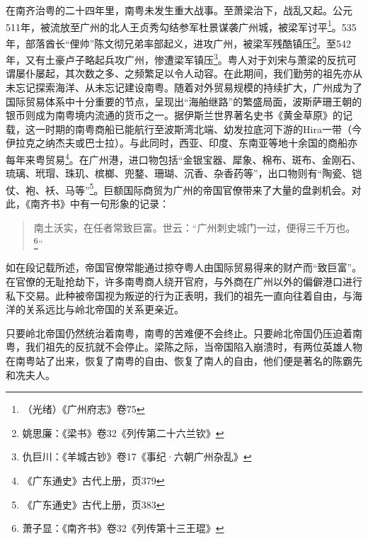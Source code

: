 在南齐治粤的二十四年里，南粤未发生重大战事。至萧梁治下，战乱又起。公元511年，被流放至广州的北人王贞秀勾结参军杜景谋袭广州城，被梁军讨平\footnote{（光绪）《广州府志》卷75}。535年，部落酋长“俚帅”陈文彻兄弟率部起义，进攻广州，被梁军残酷镇压\footnote{姚思廉：《梁书》卷32《列传第二十六兰钦》}。至542年，又有土豪卢子略起兵攻广州，惨遭梁军镇压\footnote{仇巨川：《羊城古钞》卷17《事纪·六朝广州杂乱》}。粤人对于刘宋与萧梁的反抗可谓屡仆屡起，其次数之多、之频繁足以令人动容。在此期间，我们勤劳的祖先亦从未忘记探索海洋、从未忘记建设南粤。随着对外贸易规模的持续扩大，广州成为了国际贸易体系中十分重要的节点，呈现出“海舶继路”的繁盛局面，波斯萨珊王朝的银币则成为南粤境内流通的货币之一。据伊斯兰世界著名史书《黄金草原》的记载，这一时期的南粤商船已能航行至波斯湾北端、幼发拉底河下游的Hira一带（今伊拉克之纳杰夫或巴士拉）。与此同时，西亚、印度、东南亚等地十余国的商船亦每年来粤贸易\footnote{《广东通史》古代上册，页379}。在广州港，进口物包括“金银宝器、犀象、棉布、斑布、金刚石、琉璃、玳瑁、珠玑、槟榔、兜鍪、珊瑚、沉香、杂香药等”，出口物则有“陶瓷、铠仗、袍、袄、马等”\footnote{《广东通史》古代上册，页383}。巨额国际商贸为广州的帝国官僚带来了大量的盘剥机会。对此，《南齐书》中有一句形象的记录：

\begin{quote}
	南土沃实，在任者常致巨富。世云：“广州刺史城门一过，便得三千万也。\footnote{萧子显：《南齐书》卷32《列传第十三王琨》}”
\end{quote}

如在段记载所述，帝国官僚常能通过掠夺粤人由国际贸易得来的财产而“致巨富”。在官僚的无耻抢劫下，许多南粤商人绕开官府，与外商在广州以外的偏僻港口进行私下交易。此种被帝国视为叛逆的行为正表明，我们的祖先一直向往着自由，与海洋的关系远比与岭北帝国的关系更亲近。

只要岭北帝国仍然统治着南粤，南粤的苦难便不会终止。只要岭北帝国仍压迫着南粤，我们祖先的反抗就不会停止。梁陈之际，当帝国陷入崩溃时，有两位英雄人物在南粤站了出来，恢复了南粤的自由、恢复了南人的自由，他们便是著名的陈霸先和冼夫人。

